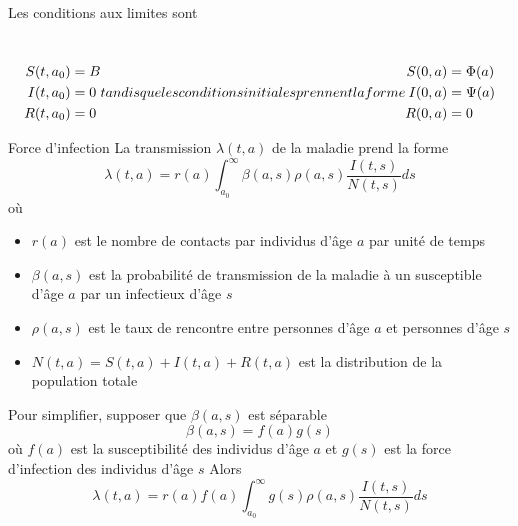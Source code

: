 \documentclass[aspectratio=169]{beamer}\usepackage[]{graphicx}\usepackage[]{xcolor}
\begin{document}
\begin{frame}
Les conditions aux limites sont
\addtocounter{equation}{-1}\
\begin{subequations}
\setcounter{equation}{3}
\begin{align}
S(t,a_0)&=B \label{sys:SIR_age_structure_BCS} \\
I(t,a_0)&=0 \label{sys:SIR_age_structure_BCI} \\
R(t,a_0)&=0 \label{sys:SIR_age_structure_BCR}
\end{align}
tandis que les conditions initiales prennent la forme
\begin{align}
S(0,a)&=\Phi(a) \label{sys:SIR_age_structure_ICS} \\
I(0,a)&=\Psi(a) \label{sys:SIR_age_structure_ICI} \\
R(0,a)&=0 \label{sys:SIR_age_structure_ICR}
\end{align}
\end{subequations}
\end{frame}

\begin{frame}{Force d'infection}
La transmission $\lambda(t,a)$ de la maladie prend la forme
\[
\lambda(t,a)=r(a)\int_{a_0}^\infty \beta(a,s)\rho(a,s)
\frac{I(t,s)}{N(t,s)}ds
\]
où 
\begin{itemize}
\item $r(a)$ est le nombre de contacts par individus d'âge $a$ par unité de temps
\item $\beta(a,s)$ est la probabilité de transmission de la maladie à un susceptible d'âge $a$ par un infectieux d'âge $s$
\item $\rho(a,s)$ est le taux de rencontre entre personnes d'âge $a$ et personnes d'âge $s$
\item $N(t,a)=S(t,a)+I(t,a)+R(t,a)$ est la distribution de la population totale
\end{itemize}
\end{frame}


\begin{frame}
Pour simplifier, supposer que $\beta(a,s)$ est séparable
\[
\beta(a,s)=f(a)g(s)
\]
où $f(a)$ est la susceptibilité des individus d'âge $a$ et $g(s)$ est la force d'infection des individus d'âge $s$
\vfill
Alors
\begin{equation}\label{eq:beta_age_dep}
\lambda(t,a)=r(a)f(a)\int_{a_0}^\infty g(s)\rho(a,s)
\frac{I(t,s)}{N(t,s)}ds
\end{equation}
\end{frame}
\end{document}
